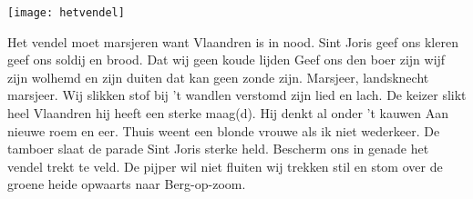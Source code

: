 \begin{intersong}
    \texttt{[image: hetvendel]}
\end{intersong}
\beginverse*
Het vendel moet marsjeren
want Vlaandren is in nood. 
Sint Joris geef ons kleren
geef ons soldij en brood. 
Dat wij geen koude lijden
Geef ons den boer zijn wijf
zijn wolhemd en zijn duiten
dat kan geen zonde zijn. 
\endverse
\beginchorus
Marsjeer, landsknecht marsjeer. 
\endchorus
\beginverse*
Wij slikken stof bij 't wandlen
verstomd zijn lied en lach. 
De keizer slikt heel Vlaandren
hij heeft een sterke maag(d).
Hij denkt al onder 't kauwen
Aan nieuwe roem en eer. 
Thuis weent een blonde vrouwe
als ik niet wederkeer. 
\endverse
\beginverse*
De tamboer slaat de parade
Sint Joris sterke held. 
Bescherm ons in genade
het vendel trekt te veld. 
De pijper wil niet fluiten
wij trekken stil en stom
over de groene heide
opwaarts naar Berg-op-zoom. 
\endverse
\endsong